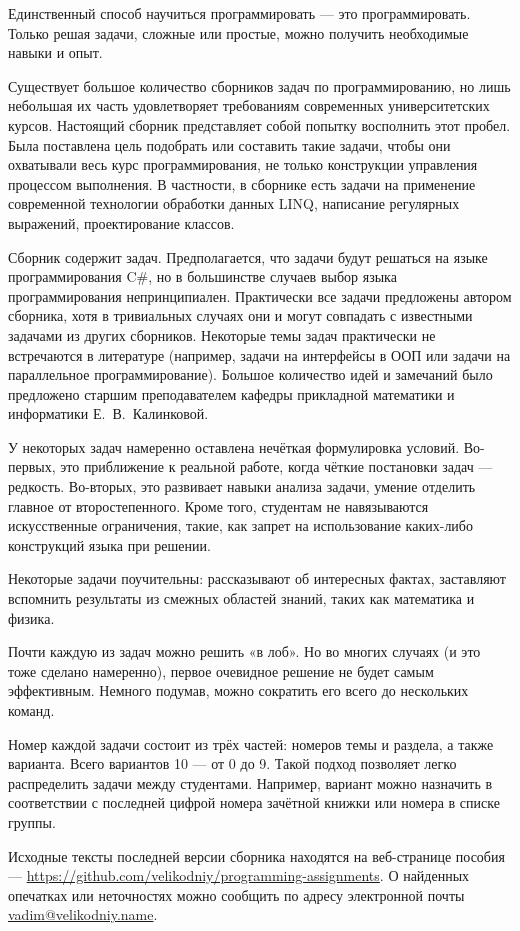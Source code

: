 
Единственный способ научиться программировать — это
программировать. Только решая задачи, сложные или простые, можно
получить необходимые навыки и опыт.

Существует большое количество сборников задач по программированию, но
лишь небольшая их часть удовлетворяет требованиям современных
университетских курсов. Настоящий сборник представляет собой попытку
восполнить этот пробел. Была поставлена цель подобрать или составить
такие задачи, чтобы они охватывали весь курс программирования, не
только конструкции управления процессом выполнения. В частности, в
сборнике есть задачи на применение современной технологии обработки
данных LINQ, написание регулярных выражений, проектирование классов.

Сборник содержит  задач. Предполагается, что задачи
будут решаться на языке программирования C\#, но в большинстве случаев
выбор языка программирования непринципиален. Практически все задачи
предложены автором сборника, хотя в тривиальных случаях они и могут
совпадать с известными задачами из других сборников. Некоторые темы
задач практически не встречаются в литературе (например, задачи на
интерфейсы в ООП или задачи на параллельное программирование). Большое
количество идей и замечаний было предложено старшим преподавателем
кафедры прикладной математики и информатики Е.~В.~Калинковой.

У некоторых задач намеренно оставлена нечёткая формулировка
условий. Во-первых, это приближение к реальной работе, когда чёткие
постановки задач — редкость. Во-вторых, это развивает навыки анализа
задачи, умение отделить главное от второстепенного. Кроме того,
студентам не навязываются искусственные ограничения, такие, как запрет
на использование каких-либо конструкций языка при решении.

Некоторые задачи поучительны: рассказывают об интересных фактах,
заставляют вспомнить результаты из смежных областей знаний, таких как
математика и физика.

Почти каждую из задач можно решить «в лоб». Но во многих случаях (и
это тоже сделано намеренно), первое очевидное решение не будет самым
эффективным. Немного подумав, можно сократить его всего до нескольких
команд.

Номер каждой задачи состоит из трёх частей: номеров темы и раздела, а
также варианта. Всего вариантов 10 — от 0 до 9. Такой подход позволяет
легко распределить задачи между студентами. Например, вариант можно
назначить в соответствии с последней цифрой номера зачётной книжки или
номера в списке группы.




Исходные тексты последней версии сборника находятся на веб-странице
пособия —
\url{https://github.com/velikodniy/programming-assignments}. О найденных
опечатках или неточностях можно сообщить по адресу электронной почты
\href{mailto:vadim@veikodniy.name}{vadim@velikodniy.name}.
